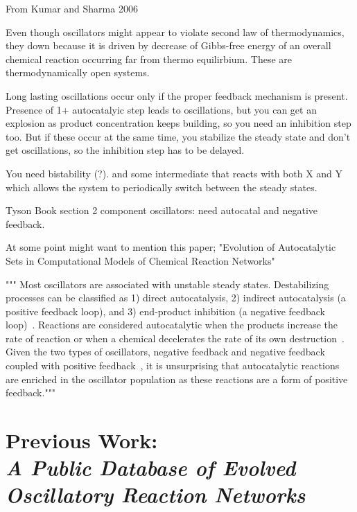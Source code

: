 \documentclass[12pt]{report}
\begin{document}
From Kumar and Sharma 2006

Even though oscillators might appear to violate second law of thermodynamics, they down because it is driven by decrease of Gibbs-free energy of an overall chemical reaction occurring far from thermo equilirbium.  These are thermodynamically open systems.

Long lasting oscillations occur only if the proper feedback mechanism is present.
Presence of 1+ autocatalyic step leads to oscillations, but you can get an explosion as product concentration keeps building, so you need an inhibition step too. But if these occur at the same time, you stabilize the steady state and don't get oscillations, so the inhibition step has to be delayed.

You need bistability (?). and some intermediate that reacts with both X and Y which allows the system to periodically switch between the steady states.

Tyson Book section
2 component oscillators: need autocatal and negative feedback. 

At some point might want to mention this paper; "Evolution of Autocatalytic Sets in Computational Models
of Chemical Reaction Networks"

"""
Most oscillators are associated with unstable steady states. Destabilizing processes can be classified as 1) direct autocatalysis, 2) indirect autocatalysis (a positive feedback loop), and 3) end-product inhibition (a negative feedback loop)~\cite{Tyson1975, tyson2007}. Reactions are considered autocatalytic when the products increase the rate of reaction or when a chemical decelerates the rate of its own destruction~\cite{Tyson2004}. Given the two types of oscillators, negative feedback and negative feedback coupled with positive feedback~\cite{Sauro_dynamics}, it is unsurprising that autocatalytic reactions are enriched in the oscillator population as these reactions are a form of positive feedback."""

\chapter{Previous Work: \\ \textit{A Public Database of Evolved Oscillatory Reaction Networks}}
\label{chap: cesium_paper}
\end{document}
